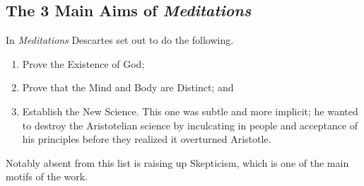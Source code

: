 \subsection*{The 3 Main Aims of \emph{Meditations}}

In \emph{Meditations} Descartes set out to do the following.
\begin{enumerate}
\item Prove the Existence of God;
\item Prove that the Mind and Body are Distinct; and
\item Establish the New Science. This one was subtle and more implicit; he wanted to destroy the Aristotelian science by inculcating in people and acceptance of his principles before they realized it overturned Aristotle.
\end{enumerate}

Notably absent from this list is raising up Skepticism, which is one of the main motifs of the work.

